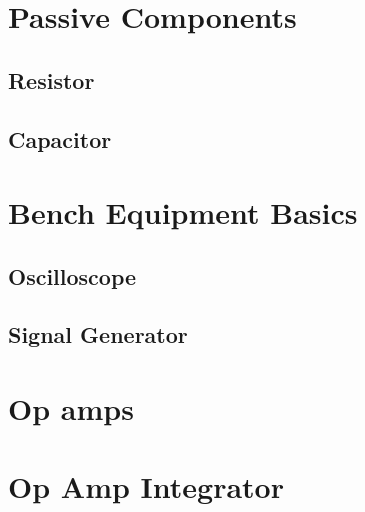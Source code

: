 \documentclass{memoir}
\begin{document}
	\section{Passive Components}
	\subsection{Resistor}
	\subsection{Capacitor}
	
	\section{Bench Equipment Basics}
	\subsection{Oscilloscope}
	\subsection{Signal Generator}
	
	\section{Op amps}
	
	\section {Op Amp Integrator}
	
\end{document}

